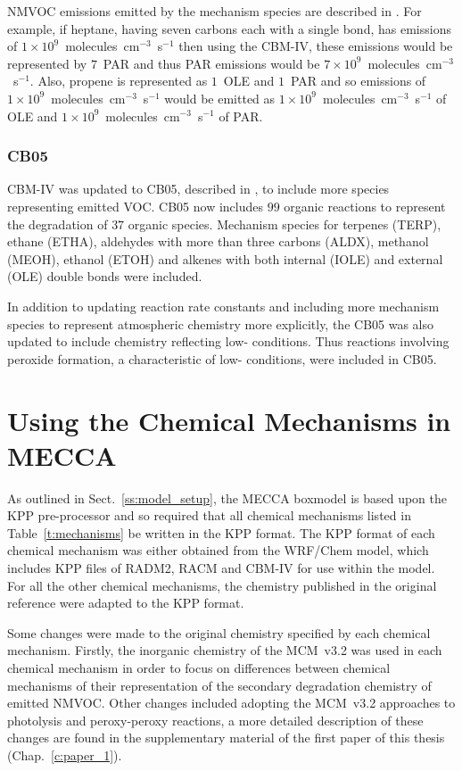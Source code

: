 NMVOC emissions emitted by the mechanism species are described in \citet{Hogo:1989}.
For example, if heptane, having seven carbons each with a single bond, has emissions of $1 \times 10^9$~molecules~cm$^{-3}$~s$^{-1}$ then using the CBM-IV, these emissions would be represented by $7$~PAR and thus PAR emissions would be $7 \times 10^9$~molecules~cm$^{-3}$~s$^{-1}$.
Also, propene is represented as $1$~OLE and $1$~PAR and so emissions of $1 \times 10^9$~molecules~cm$^{-3}$~s$^{-1}$  would be emitted as $1 \times 10^9$~molecules~cm$^{-3}$~s$^{-1}$ of OLE and $1 \times 10^9$~molecules~cm$^{-3}$~s$^{-1}$ of PAR.

\subsubsection{CB05}
CBM-IV was updated to CB05, described in \citet{Yarwood:2005}, to include more species representing emitted VOC.
CB05 now includes $99$ organic reactions to represent the degradation of $37$ organic species.
Mechanism species for terpenes (TERP), ethane (ETHA), aldehydes with more than three carbons (ALDX), methanol (MEOH), ethanol (ETOH) and alkenes with both internal (IOLE) and external (OLE) double bonds were included.  

In addition to updating reaction rate constants and including more mechanism species to represent atmospheric chemistry more explicitly, the CB05 was also updated to include chemistry reflecting low- conditions.
Thus reactions involving peroxide formation, a characteristic of low- conditions, were included in CB05.

\section{Using the Chemical Mechanisms in MECCA}
As outlined in Sect.~\ref{ss:model_setup}, the MECCA boxmodel is based upon the KPP pre-processor and so required that all chemical mechanisms listed in Table~\ref{t:mechanisms} be written in the KPP format.
The KPP format of each chemical mechanism was either obtained from the WRF/Chem \citep{Grell:2005}  model, which includes KPP files of RADM2, RACM and CBM-IV for use within the model.
For all the other chemical mechanisms, the chemistry published in the original reference were adapted to the KPP format.

Some changes were made to the original chemistry specified by each chemical mechanism.
Firstly, the inorganic chemistry of the MCM~v3.2 was used in each chemical mechanism in order to focus on differences between chemical mechanisms of their representation of the secondary degradation chemistry of emitted NMVOC.
Other changes included adopting the MCM~v3.2 approaches to photolysis and peroxy-peroxy reactions, a more detailed description of these changes are found in the supplementary material of the first paper of this thesis (Chap.~\ref{c:paper_1}). 
